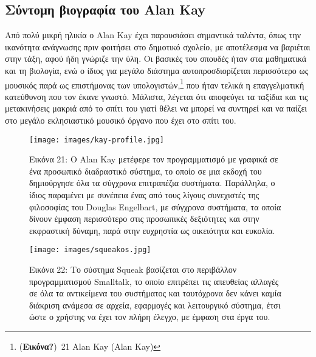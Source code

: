 \documentclass[
]{article}
\begin{document}
\hypertarget{ux3c3ux3cdux3bdux3c4ux3bfux3bcux3b7-ux3b2ux3b9ux3bfux3b3ux3c1ux3b1ux3c6ux3afux3b1-ux3c4ux3bfux3c5-alan-kay}{%
\subsection{Σύντομη βιογραφία του Alan
Kay}\label{ux3c3ux3cdux3bdux3c4ux3bfux3bcux3b7-ux3b2ux3b9ux3bfux3b3ux3c1ux3b1ux3c6ux3afux3b1-ux3c4ux3bfux3c5-alan-kay}}

Από πολύ μικρή ηλικία ο Alan Kay έχει παρουσιάσει σημαντικά ταλέντα,
όπως την ικανότητα ανάγνωσης πριν φοιτήσει στο δημοτικό σχολείο, με
αποτέλεσμα να βαριέται στην τάξη, αφού ήδη γνώριζε την ύλη. Οι βασικές
του σπουδές ήταν στα μαθηματικά και τη βιολογία, ενώ ο ίδιος για μεγάλο
διάστημα αυτοπροσδιορίζεται περισσότερο ως μουσικός παρά ως επιστήμονας
των υπολογιστών,\footnote{(\textbf{Εικόνα?})~21 Alan Kay (Alan Kay)} που
ήταν τελικά η επαγγελματική κατεύθυνση που τον έκανε γνωστό. Μάλιστα,
λέγεται ότι αποφεύγει τα ταξίδια και τις μετακινήσεις μακριά από το
σπίτι του γιατί θέλει να μπορεί να συντηρεί και να παίζει στο μεγάλο
εκλησιαστικό μουσικό όργανο που έχει στο σπίτι του.

\leavevmode{}%
\begin{figure}
\hypertarget{fig:kay-profile}{%
\centering
\texttt{[image: images/kay-profile.jpg]}
\caption{Εικόνα 21: Ο Alan Kay μετέφερε τον προγραμματισμό με γραφικά σε
ένα προσωπικό διαδραστικό σύστημα, το οποίο σε μια εκδοχή του
δημιούργησε όλα τα σύγχρονα επιτραπέζια συστήματα. Παράλληλα, ο ίδιος
παραμένει με συνέπεια ένας από τους λίγους συνεχιστές της φιλοσοφίας του
Douglas Engelbart, με σύγχρονα συστήματα, τα οποία δίνουν έμφαση
περισσότερο στις προσωπικές δεξιότητες και στην εκφραστική δύναμη, παρά
στην ευχρηστία ως οικειότητα και ευκολία.}\label{fig:kay-profile}
}
\end{figure}

\leavevmode{}%
\begin{figure}
\hypertarget{fig:squeakos}{%
\centering
\texttt{[image: images/squeakos.jpg]}
\caption{Εικόνα 22: Το σύστημα Squeak βασίζεται στο περιβάλλον
προγραμματισμού Smalltalk, το οποίο επιτρέπει τις απευθείας αλλαγές σε
όλα τα αντικείμενα του συστήματος και ταυτόχρονα δεν κάνει καμία
διάκριση ανάμεσα σε αρχεία, εφαρμογές και λειτουργικό σύστημα, έτσι ώστε
ο χρήστης να έχει τον πλήρη έλεγχο, με έμφαση στα έργα
του.}\label{fig:squeakos}
}
\end{figure}
\end{document}
